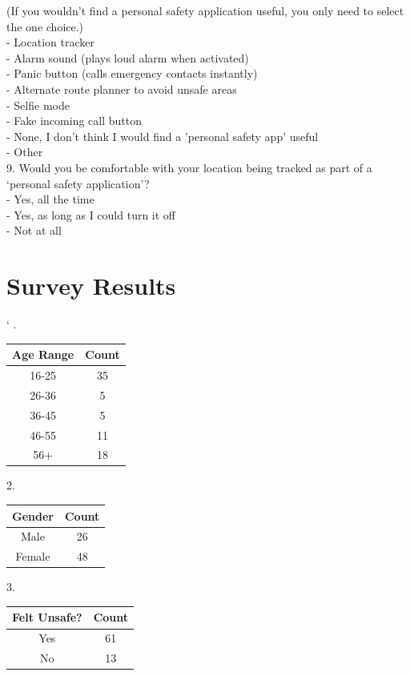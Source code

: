 \documentclass[a4paper]{report}
\begin{document}
(If you wouldn’t find a personal safety application useful, you only need to select the one choice.)\\
- Location tracker\\
- Alarm sound (plays loud alarm when activated)\\
- Panic button (calls emergency contacts instantly)\\
- Alternate route planner to avoid unsafe areas\\
- Selfie mode\\
- Fake incoming call button\\
- None, I don't think I would find a 'personal safety app' useful\\
- Other\\
9. Would you be comfortable with your location being tracked as part of a ‘personal safety application’?\\
- Yes, all the time\\
- Yes, as long as I could turn it off\\
- Not at all\\
\newpage
\chapter{Survey Results} `	
\label{app:Results}
. \begin{tabular} {|c|c|}
	\hline
		Age Range & Count \\
		\hline
		16-25 & 35 \\
		\hline
		26-36 & 5 \\
		\hline
		36-45 & 5 \\
		\hline
		46-55 & 11 \\
		\hline
		56+ & 18 \\
		\hline
	\end{tabular}
\bigskip

2. \begin{tabular} {|c|c|}
	\hline
	Gender & Count \\
	\hline
	Male & 26 \\
	\hline
	Female & 48 \\
	\hline
\end{tabular}
\bigskip

3. \begin{tabular} {|c|c|}
	\hline
	Felt Unsafe? & Count \\
	\hline
	Yes & 61 \\
	\hline
	No & 13 \\
	\hline
\end{tabular}
\bigskip
\end{document}
